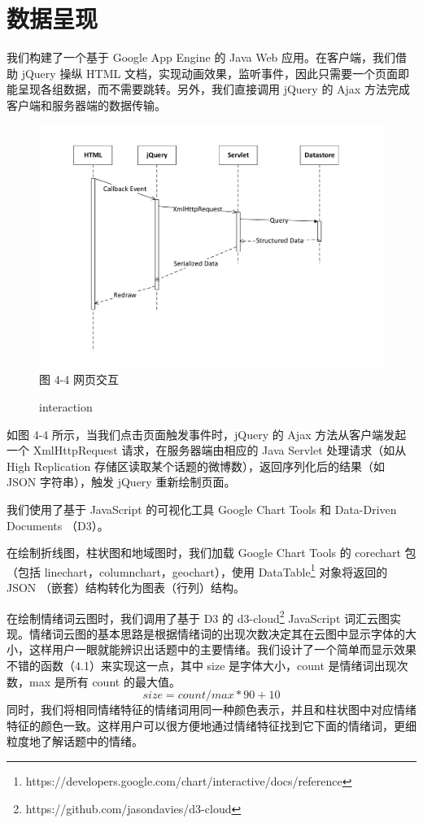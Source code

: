 \section{数据呈现}
我们构建了一个基于 Google App Engine 的 Java Web 应用。在客户端，我们借助 jQuery 操纵 HTML 文档，实现动画效果，监听事件，因此只需要一个页面即能呈现各组数据，而不需要跳转。另外，我们直接调用 jQuery 的 Ajax 方法完成客户端和服务器端的数据传输。

\begin{figure}[!h]
\centering
\includegraphics[width=\textwidth, height=0.4\textheight]{jQuery}
图 4-4 网页交互
\caption{interaction}
\end{figure}

如图 4-4 所示，当我们点击页面触发事件时，jQuery 的 Ajax 方法从客户端发起一个 XmlHttpRequest 请求，在服务器端由相应的 Java Servlet\cite{servlet} 处理请求（如从 High Replication 存储区读取某个话题的微博数），返回序列化后的结果（如 JSON 字符串），触发 jQuery 重新绘制页面。

我们使用了基于 JavaScript 的可视化工具 Google Chart Tools 和 Data-Driven Documents （D3）。

在绘制折线图，柱状图和地域图时，我们加载 Google Chart Tools 的 corechart 包（包括 linechart，columnchart，geochart），使用 DataTable\footnote{ https://developers.google.com/chart/interactive/docs/reference} 对象将返回的 JSON （嵌套）结构转化为图表（行列）结构。

在绘制情绪词云图时，我们调用了基于 D3 的 d3-cloud\footnote{https://github.com/jasondavies/d3-cloud} JavaScript 词汇云图实现。情绪词云图的基本思路是根据情绪词的出现次数决定其在云图中显示字体的大小，这样用户一眼就能辨识出话题中的主要情绪。我们设计了一个简单而显示效果不错的函数（4.1）来实现这一点，其中 size 是字体大小，count 是情绪词出现次数，max 是所有 count 的最大值。
\begin{equation}
 size = count / max * 90 + 10
\end{equation}
同时，我们将相同情绪特征的情绪词用同一种颜色表示，并且和柱状图中对应情绪特征的颜色一致。这样用户可以很方便地通过情绪特征找到它下面的情绪词，更细粒度地了解话题中的情绪。



